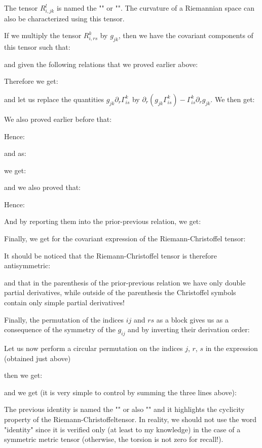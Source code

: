 	The tensor $R_{i,jk}^l$ is named the "" or "". The curvature of a Riemannian space can also be characterized using this tensor.

	If we multiply the tensor $R_{i,rs}^k$ by $g_{jk}$, then we have the covariant components of this tensor such that:
	
	and given the following relations that we proved earlier above:
	
	Therefore we get:
	
	and let us replace the quantities $g_{jk}\partial_r\Gamma_{is}^k$ by $\partial_r\left(g_{jk}\Gamma_{is}^k\right)-\Gamma_{is}^k\partial_r g_{jk}$. We then get:
	
	We also proved earlier before that:
	
	Hence:
	
	and as:
	
	we get:
	
	and we also proved that:
	
	Hence:
	
	And by reporting them into the prior-previous relation, we get:
	
	Finally, we get for the covariant expression of the Riemann-Christoffel tensor:
	
	It should be noticed that the Riemann-Christoffel tensor is therefore antisymmetric:
	
	and that in the parenthesis of the prior-previous relation we have only double partial derivatives, while outside of the parenthesis the Christoffel symbols contain only simple partial derivatives!

	Finally, the permutation of the indices $ij$ and $rs$ as a block gives us as a consequence of the symmetry of the $g_{ij}$ and by inverting their derivation order:
	
	Let us now perform a circular permutation on the indices $j$, $r$, $s$ in the expression (obtained just above)
	
	then we get:
	
	and we get (it is very simple to control by summing the three lines above):
	
	The previous identity is named the "" or also "" and it highlights the cyclicity property of the  Riemann-Christoffeltensor. In reality, we should not use the word "identity" since it is verified only (at least to my knowledge) in the case of a symmetric metric tensor (otherwise, the torsion is not zero for recall!).

